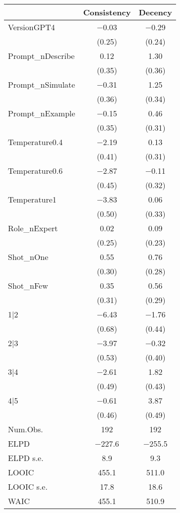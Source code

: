 \documentclass[
  letterpaper,
  DIV=11,
  numbers=noendperiod]{scrartcl}
\begin{document}
\begin{table}
\centering
\begin{tabular}[t]{lcc}
\toprule
  & Consistency & Decency\\
\midrule
VersionGPT4 & \num{-0.03} & \num{-0.29}\\
 & (\num{0.25}) & (\num{0.24})\\
Prompt\_nDescribe & \num{0.12} & \num{1.30}\\
 & (\num{0.35}) & (\num{0.36})\\
Prompt\_nSimulate & \num{-0.31} & \num{1.25}\\
 & (\num{0.36}) & (\num{0.34})\\
Prompt\_nExample & \num{-0.15} & \num{0.46}\\
 & (\num{0.35}) & (\num{0.31})\\
Temperature0.4 & \num{-2.19} & \num{0.13}\\
 & (\num{0.41}) & (\num{0.31})\\
Temperature0.6 & \num{-2.87} & \num{-0.11}\\
 & (\num{0.45}) & (\num{0.32})\\
Temperature1 & \num{-3.83} & \num{0.06}\\
 & (\num{0.50}) & (\num{0.33})\\
Role\_nExpert & \num{0.02} & \num{0.09}\\
 & (\num{0.25}) & (\num{0.23})\\
Shot\_nOne & \num{0.55} & \num{0.76}\\
 & (\num{0.30}) & (\num{0.28})\\
Shot\_nFew & \num{0.35} & \num{0.56}\\
 & (\num{0.31}) & (\num{0.29})\\
1|2 & \num{-6.43} & \num{-1.76}\\
 & (\num{0.68}) & (\num{0.44})\\
2|3 & \num{-3.97} & \num{-0.32}\\
 & (\num{0.53}) & (\num{0.40})\\
3|4 & \num{-2.61} & \num{1.82}\\
 & (\num{0.49}) & (\num{0.43})\\
4|5 & \num{-0.61} & \num{3.87}\\
 & (\num{0.46}) & (\num{0.49})\\
\midrule
Num.Obs. & \num{192} & \num{192}\\
ELPD & \num{-227.6} & \num{-255.5}\\
ELPD s.e. & \num{8.9} & \num{9.3}\\
LOOIC & \num{455.1} & \num{511.0}\\
LOOIC s.e. & \num{17.8} & \num{18.6}\\
WAIC & \num{455.1} & \num{510.9}\\
\bottomrule
\end{tabular}
\end{table}
\end{document}
